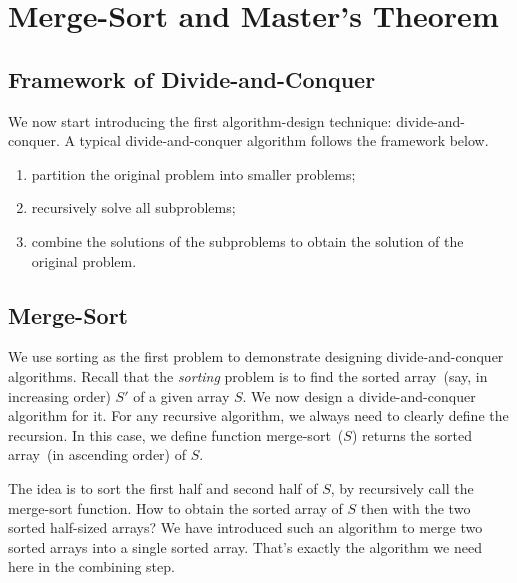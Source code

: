 \section{Merge-Sort and Master's Theorem}

\subsection*{Framework of Divide-and-Conquer}

We now start introducing the first algorithm-design technique:
divide-and-conquer. 
A typical divide-and-conquer algorithm follows the framework below.
\vspace*{-\topsep}
\begin{enumerate}
\item partition the original problem into smaller problems;
\item recursively solve all subproblems;
\item combine the solutions of the subproblems to obtain the solution of the original problem.
\end{enumerate}

\subsection*{Merge-Sort}

We use sorting as the first problem
to demonstrate designing divide-and-conquer algorithms.
Recall that the \emph{sorting} problem is to find the sorted array~(say, in increasing order) $S'$ of a given array $S$.  
We now design a divide-and-conquer algorithm for it. For any recursive algorithm, we always need to
clearly define the recursion. In this case, we define function merge-sort~($S$) returns the
sorted array~(in ascending order) of $S$.

The idea is to sort the first half and second half of $S$, by recursively call the merge-sort function.
How to obtain the sorted array of $S$ then with the two sorted half-sized arrays?
We have introduced such an algorithm to merge two sorted arrays into a single sorted array.
That's exactly the algorithm we need here in the combining step.

\begin{minipage}{0.8\textwidth}
	\xxx
	\xxx
	\xxx
	\xxx
	\xxx
	\xxx
\end{minipage}

